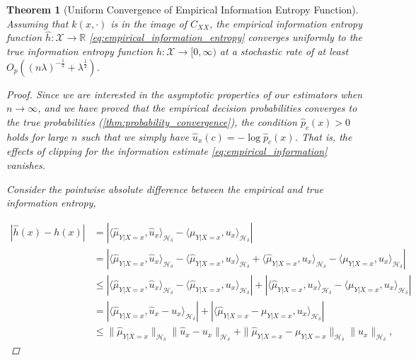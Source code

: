 \documentclass{article}
\newtheorem{theorem}{Theorem}[section]
\begin{document}
	\begin{theorem}[Uniform Convergence of Empirical Information Entropy Function]
		\label{thm:entropy_convergence}
		Assuming that $k(x, \cdot)$ is in the image of $C_{XX}$, the empirical information entropy function $\hat{h} : \mathcal{X} \to \mathbb{R}$ \eqref{eq:empirical_information_entropy} converges uniformly to the true information entropy function $h : \mathcal{X} \to [0, \infty)$ at a stochastic rate of at least $O_{p}((n \lambda)^{-\frac{1}{2}} + \lambda^{\frac{1}{2}})$.
		
		\begin{proof}
			Since we are interested in the asymptotic properties of our estimators when $n \to \infty$, and we have proved that the empirical decision probabilities converges to the true probabilities (\cref{thm:probability_convergence}), the condition $\hat{p}_{c}(x) > 0$ holds for large $n$ such that we simply have $\hat{u}_{x}(c) = - \log{\hat{p}_{c}(x)}$. That is, the effects of clipping for the information estimate \eqref{eq:empirical_information} vanishes.
			
			Consider the pointwise absolute difference between the empirical and true information entropy,
			
			\begin{equation}
			\begin{aligned}
				| \hat{h}(x) - h(x) | &= | \langle \hat{\mu}_{Y | X = x}, \hat{u}_{x} \rangle_{\mathcal{H}_{\delta}} - \langle \mu_{Y | X = x}, u_{x} \rangle_{\mathcal{H}_{\delta}} | \\
				&= | \langle \hat{\mu}_{Y | X = x}, \hat{u}_{x} \rangle_{\mathcal{H}_{\delta}} - \langle \hat{\mu}_{Y | X = x}, u_{x} \rangle_{\mathcal{H}_{\delta}} + \langle \hat{\mu}_{Y | X = x}, u_{x} \rangle_{\mathcal{H}_{\delta}} - \langle \mu_{Y | X = x}, u_{x} \rangle_{\mathcal{H}_{\delta}} | \\
				&\leq | \langle \hat{\mu}_{Y | X = x}, \hat{u}_{x} \rangle_{\mathcal{H}_{\delta}} - \langle \hat{\mu}_{Y | X = x}, u_{x} \rangle_{\mathcal{H}_{\delta}} | + | \langle \hat{\mu}_{Y | X = x}, u_{x} \rangle_{\mathcal{H}_{\delta}} - \langle \mu_{Y | X = x}, u_{x} \rangle_{\mathcal{H}_{\delta}} | \\
				&= | \langle \hat{\mu}_{Y | X = x}, \hat{u}_{x} - u_{x} \rangle_{\mathcal{H}_{\delta}} | + | \langle \hat{\mu}_{Y | X = x} - \mu_{Y | X = x}, u_{x} \rangle_{\mathcal{H}_{\delta}} | \\
				&\leq \| \hat{\mu}_{Y | X = x} \|_{\mathcal{H}_{\delta}} \| \hat{u}_{x} - u_{x} \|_{\mathcal{H}_{\delta}} + \| \hat{\mu}_{Y | X = x} - \mu_{Y | X = x} \|_{\mathcal{H}_{\delta}} \| u_{x} \|_{\mathcal{H}_{\delta}},
			\label{eq:information_entropy_bound}
			\end{aligned}
			\end{equation}
			

\end{proof}
\end{theorem}
\end{document}
